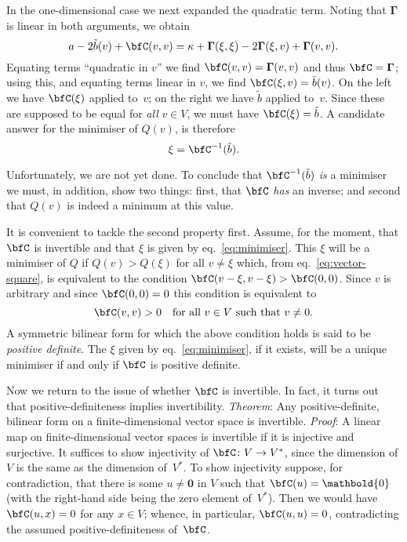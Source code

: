 \documentclass[10pt, a4paper]{article}
\newcommand{\bzero}{\mathbold{0}} %
\begin{document}
In the one-dimensional case we next expanded the quadratic
term. Noting that $\bm{\Gamma}$ is linear in both arguments, we obtain
\[
  a -2\tilde{b}(v)+\bfC(v,v) = \kappa+\bm{\Gamma}(\xi,\xi) -2\bm{\Gamma}(\xi,v) + \bm{\Gamma}(v,v).
\]
Equating terms ``quadratic in $v$'' we find
$\bm{\bfC}(v,v) = \bm{\Gamma}(v,v)$ and thus $\bfC=\bm{\Gamma}$; using this, and
equating terms linear in $v$, we find $\bfC(\xi, v) = \tilde{b}(v)$. On
the left we have $\bfC(\xi)$ applied to~$v$; on the right we have
$\tilde{b}$ applied to~$v$. Since these are supposed to be equal for
\emph{all} $v\in V$, we must have $\bfC(\xi) = \tilde{b}$. A candidate
answer for the minimiser of $Q(v)$, is therefore
\begin{equation}
  \label{eq:minimiser}
  \xi = \bfC^{-1}(\tilde{b}).
\end{equation}

Unfortunately, we are not yet done. To conclude that
$\bfC^{-1}(\tilde{b})$ \emph{is} a minimiser we must, in addition,
show two things: first, that $\bfC$ \emph{has} an inverse; and second
that $Q(v)$ is indeed a minimum at this value.

It is convenient to tackle the second property first. Assume, for the
moment, that $\bfC$ is invertible and that $\xi$ is given by
eq.~\eqref{eq:minimiser}. This $\xi$ will be a minimiser of $Q$ if
$Q(v)>Q(\xi)$ for all $v \neq \xi$ which, from eq.~\eqref{eq:vector-square},
is equivalent to the condition $\bfC(v-\xi,v-\xi)>\bfC(0,0)$. Since
$v$ is arbitrary and since $\bfC(0,0)=0$ this condition is equivalent
to
\[
  \bfC(v,v) > 0 \quad\text{for all $v\in V$ such that $v\neq0$}.
\]
A symmetric bilinear form for which the above condition holds is said
to be \emph{positive definite}. The $\xi$ given by
eq.~\eqref{eq:minimiser}, if it exists, will be a unique minimiser if
and only if $\bfC$ is positive definite.

Now we return to the issue of whether $\bfC$ is invertible. In fact,
it turns out that positive-definiteness implies
invertibility. \emph{Theorem}: Any positive-definite, bilinear form on
a finite-dimensional vector space is invertible. \emph{Proof}: A
linear map on finite-dimensional vector spaces is invertible if it is
injective and surjective. It suffices to show injectivity of
$\bfC\colon V\to V^*$, since the dimension of $V$ is the same as the
dimension of~$V^*$. To show injectivity suppose, for contradiction,
that there is some $u\neq\bzero$ in $V$ such that $\bfC(u)=\bzero$ (with
the right-hand side being the zero element of~$V^*$). Then we would
have $\bfC(u, x) = 0$ for any $x\in V$; whence, in particular,
$\bfC(u,u)=0$, contradicting the assumed positive-definiteness
of~$\bfC$.
\end{document}
